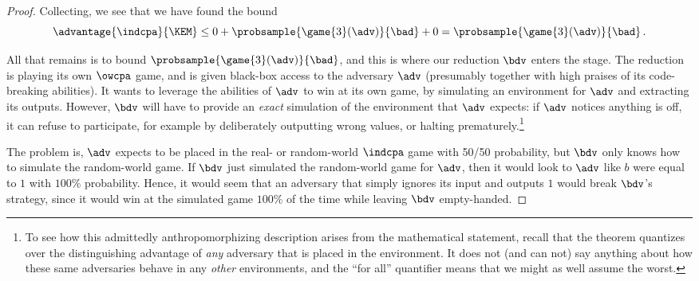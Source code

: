 \begin{proof}
      Collecting, we see that we have found the bound
      \[
        \advantage{\indcpa}{\KEM} 
            \leq 0 + \probsample{\game{3}(\adv)}{\bad} + 0 =
            \probsample{\game{3}(\adv)}{\bad}\, .
      \]

      All that remains is to bound $\probsample{\game{3}(\adv)}{\bad}$,
        and this is where our reduction $\bdv$ enters the stage.
        The reduction is playing its own $\owcpa$ game, and is given black-box
        access to the adversary $\adv$ (presumably together with high praises
        of its code-breaking abilities). It wants to leverage the abilities of
        $\adv$ to win at its own game, by simulating an environment for
        $\adv$ and extracting its outputs. However, $\bdv$ will have to
        provide an \emph{exact} simulation of the environment that $\adv$
        expects: if $\adv$ notices anything is off, it can refuse to
        participate, for example by deliberately outputting wrong values, or
        halting prematurely.\footnote{
          To see how this admittedly anthropomorphizing description arises from the
          mathematical statement, recall that the theorem quantizes
          over the distinguishing advantage of \emph{any} adversary that is
          placed in the \indcpa environment. It does not (and can not) say anything
          about how these same adversaries behave in any \emph{other}
          environments, and the ``for all'' quantifier means that we 
          might as well assume the worst.
        }

      The problem is, $\adv$ expects to be placed in the real- or random-world
        $\indcpa$ game with 50/50 probability, but $\bdv$ only knows how to
        simulate the random-world game. 
        If $\bdv$ just simulated the random-world game for $\adv$,
        then it would look to $\adv$ like $b$ were equal to $1$ with $100\%$
        probability. Hence, it would seem that an adversary that simply ignores
        its input and outputs $1$ would break $\bdv$'s strategy, since it
        would win at the simulated game $100\%$ of the time while leaving $\bdv$
        empty-handed.


\end{proof}
